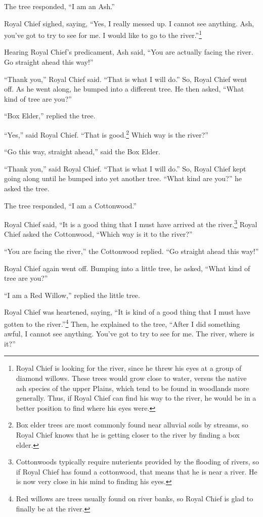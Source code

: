 The tree responded, ``I am an Ash.''

Royal Chief sighed, saying, ``Yes, I really messed up. I cannot see anything. Ash, you've got to try to see for me. I would like to go to the river.''\footnote{Royal Chief is looking for the river, since he threw his eyes at a group of diamond willows. These trees would grow close to water, versus the native ash species of the upper Plains, which tend to be found in woodlands more generally. Thus, if Royal Chief can find his way to the river, he would be in a better position to find where his eyes were.}

Hearing Royal Chief's predicament, Ash said, ``You are actually facing the river. Go straight ahead this way!''

``Thank you,'' Royal Chief said. ``That is what I will do.'' So, Royal Chief went off. As he went along, he bumped into a different tree. He then asked, ``What kind of tree are you?''

``Box Elder,'' replied the tree.

``Yes,'' said Royal Chief. ``That is good.\footnote{Box elder trees are most commonly found near alluvial soils by streams, so Royal Chief knows that he is getting closer to the river by finding a box elder.} Which way is the river?''

``Go this way, straight ahead,'' said the Box Elder.

``Thank you,'' said Royal Chief. ``That is what I will do.'' So, Royal Chief kept going along until he bumped into yet another tree. ``What kind are you?'' he asked the tree.

The tree responded, ``I am a Cottonwood.''

Royal Chief said, ``It is a good thing that I must have arrived at the river.\footnote{Cottonwoods typically require nuterients provided by the flooding of rivers, so if Royal Chief has found a cottonwood, that means that he is near a river. He is now very close in his mind to finding his eyes.} Royal Chief asked the Cottonwood, ``Which way is it to the river?''

``You are facing the river,'' the Cottonwood replied. ``Go straight ahead this way!''

Royal Chief again went off. Bumping into a little tree, he asked, ``What kind of tree are you?''

``I am a Red Willow,'' replied the little tree.

Royal Chief was heartened, saying, ``It is kind of a good thing that I must have gotten to the river.''\footnote{Red willows are trees usually found on river banks, so Royal Chief is glad to finally be at the river.} Then, he explained to the tree, ``After I did something awful, I cannot see anything. You've got to try to see for me. The river, where is it?''

